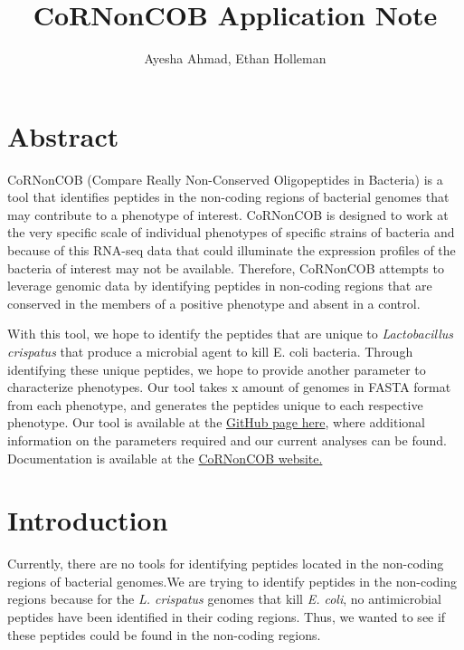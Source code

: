 \documentclass{article}
\begin{document}
\title{CoRNonCOB Application Note
	   \medskip \large}
\author{Ayesha Ahmad, Ethan Holleman}

\maketitle

\newpage

\section{Abstract}
CoRNonCOB (Compare Really Non-Conserved Oligopeptides in Bacteria) is a tool that identifies peptides in the non-coding regions of bacterial genomes that may contribute to a phenotype of interest. CoRNonCOB is designed to work at the very specific scale of individual phenotypes of specific strains of bacteria and because of this RNA-seq data that could illuminate the expression profiles of the bacteria of interest may not be available. Therefore, CoRNonCOB attempts to leverage genomic data by identifying peptides in non-coding regions that are conserved in the members of a positive phenotype and absent in a control.

With this tool, we hope to identify the peptides that are unique to \emph{Lactobacillus crispatus} that produce a microbial agent to kill E. coli bacteria. Through identifying these unique peptides, we hope to provide another parameter to characterize phenotypes. Our tool takes x amount of genomes in FASTA format  from each phenotype, and generates the peptides unique to each respective phenotype. Our tool is available at the \href{ https://github.com/EthanHolleman/CoRNonCOB}{GitHub page here}, where additional information on the parameters required and our current analyses can be found. Documentation is available at the \href{https://ethanholleman.github.io/CoRNonCOB/index.html}{CoRNonCOB website.}

\section{Introduction}
Currently, there are no tools for identifying peptides located in the non-coding regions of bacterial genomes.We are trying to identify peptides in the non-coding regions because for the \emph{L. crispatus} genomes that kill \emph{E. coli}, no antimicrobial peptides have been identified in their coding regions. Thus, we wanted to see if these peptides could be found in the non-coding regions. 
\end{document}
